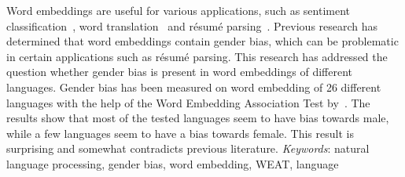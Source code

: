 
Word embeddings are useful for various applications, such as sentiment
classification~\parencite{tang2014learning}, word translation~\parencite{xing2015normalized} and résumé parsing~\parencite{nasser2018convolutional}. 
Previous research has determined that word embeddings contain gender
bias, which can be problematic in certain applications such as résumé parsing.
This research has addressed the question whether gender bias is present in word
embeddings of different languages.
Gender bias has been measured on word embedding of 26 different languages with the help
of the Word Embedding Association Test
by~\textcite{caliskan_2017_semantics_language_corpora}.
The results show that most of the tested languages seem to have bias towards male,
while a few languages seem to have a bias towards female.
This result is surprising and somewhat contradicts previous literature.
\newline
\newline
\emph{Keywords}: natural language processing, gender bias, word embedding, WEAT, language
